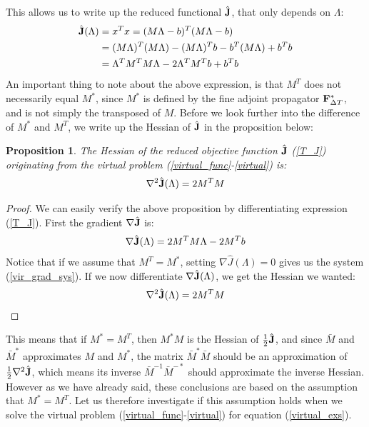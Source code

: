 \documentclass[11pt,a4paper]{article}
\newtheorem{proposition}{Proposition}
\begin{document}
This allows us to write up the reduced functional $\hat{\bold J}$, that only depends on $\Lambda$:
\begin{align}
\hat{\bold J}(\Lambda)&= x^Tx =
(M  \Lambda -b)^T(M  \Lambda -b) \\
&= (M  \Lambda)^T(M  \Lambda) - (M  \Lambda)^Tb-b^T(M  \Lambda) + b^Tb \\
&=\Lambda^TM^TM  \Lambda - 2\Lambda^TM^Tb + b^Tb \label{T_J}
\end{align}
An important thing to note about the above expression, is that $M^T$ does not necessarily equal $M^*$, since $M^*$ is defined by the fine adjoint propagator $\bold F_ {\Delta T}^*$, and is not simply the transposed of $M$. Before we look further into the difference of $M^*$ and $M^T$, we write up the Hessian of $\hat{\bold J}$ in the proposition below:
\begin{proposition}\label{prop_lLS}
The Hessian of the reduced objective function $\hat{\bold J}$ (\ref{T_J}) originating from the virtual problem (\ref{virtual_func}-\ref{virtual}) is:
\begin{align}
\nabla^2\hat{\bold J}(\Lambda) = 2 M^TM
\end{align}
\end{proposition}
\begin{proof}
We can easily verify the above proposition by differentiating expression (\ref{T_J}). First the gradient $\nabla \hat{\bold J}$ is:
\begin{align*}
\nabla\hat{\bold J}(\Lambda) = 2 M^TM\Lambda - 2M^Tb
\end{align*}
Notice that if we assume that $M^T=M^*$, setting $\nabla\hat{J}(\Lambda)=0$ gives us the system (\ref{vir_grad_sys}). If we now differentiate $\nabla \hat{\bold J}(\Lambda)$, we get the Hessian we wanted:
\begin{align}
\nabla^2 \hat{\bold J}(\Lambda) = 2 M^TM
\end{align}
\end{proof}
\noindent
This means that if $M^*=M^T$, then $M^*M$ is the Hessian of $\frac{1}{2}\hat{\bold J}$, and since $\bar{M}$ and $\bar{M}^*$ approximates $M$ and $M^*$, the matrix $\bar{M}^{*}\bar{M}$ should be an approximation of $\frac{1}{2}\nabla^2 \hat{\bold J}$, which means its inverse $\bar{M}^{-1}\bar{M}^{-*}$ should approximate the inverse Hessian. However as we have already said, these conclusions are based on the assumption that $M^*=M^T$. Let us therefore investigate if this assumption holds when we solve the virtual problem (\ref{virtual_func}-\ref{virtual}) for equation (\ref{virtual_exs}). 
\end{document}
